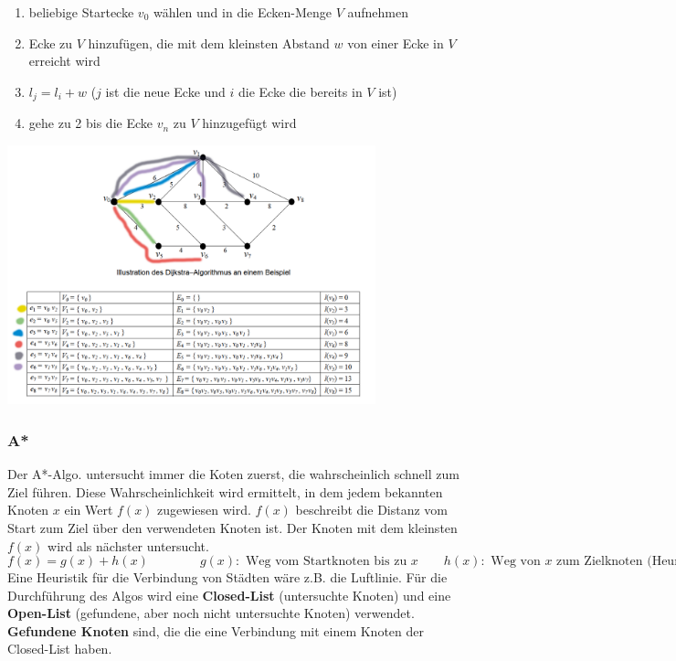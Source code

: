 \begin{enumerate}
	\item beliebige Startecke $v_0$ wählen und in die Ecken-Menge $V$ aufnehmen
	\item Ecke zu $V$ hinzufügen, die mit dem kleinsten Abstand $w$ von einer Ecke in $V$ erreicht wird
	\item $l_j = l_i + w$ ($j$ ist die neue Ecke und $i$ die Ecke die bereits in $V$ ist)
	\item gehe zu 2 bis die Ecke $v_n$ zu $V$ hinzugefügt wird
\end{enumerate}

\begin{center}
	\includegraphics[width=0.8\textwidth]{Content/Graphen/Dijkstra.png}
\end{center}


\subsubsection{A*}
Der A*-Algo. untersucht immer die Koten zuerst, die wahrscheinlich schnell zum Ziel führen. Diese Wahrscheinlichkeit wird ermittelt, in dem jedem bekannten Knoten $x$ ein Wert $f(x)$ zugewiesen wird. $f(x)$ beschreibt die Distanz vom Start zum Ziel über den verwendeten Knoten ist. Der Knoten mit dem kleinsten $f(x)$ wird als nächster untersucht.
\[ f(x) = g(x) + h(x) \qquad \qquad g(x): \text{ Weg vom Startknoten bis zu }x  \qquad h(x): \text{ Weg von $x$ zum Zielknoten (Heuristik)}\]
Eine Heuristik für die Verbindung von Städten wäre z.B. die Luftlinie. Für die Durchführung des Algos wird eine \textbf{Closed-List} (untersuchte Knoten) und eine \textbf{Open-List} (gefundene, aber noch nicht untersuchte Knoten) verwendet. \textbf{Gefundene Knoten} sind, die die eine Verbindung mit einem Knoten der Closed-List haben.\\

